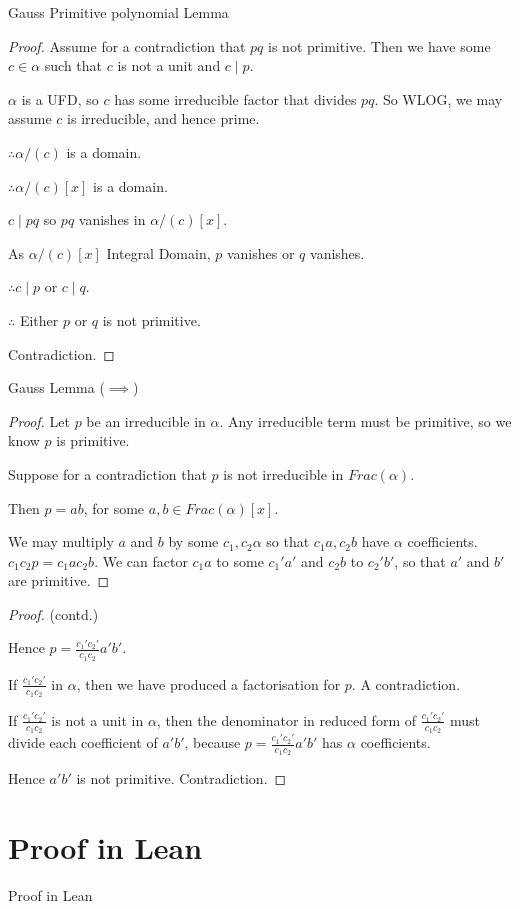 \documentclass{beamer}
\begin{document}
\begin{frame}{Gauss Primitive polynomial Lemma}
  \begin{proof}
    Assume for a contradiction that $pq$ is not primitive. 
    Then we have some $c \in \alpha$ such that $c$ is not a unit and $c \mid p$. 
   
    $\alpha$ is a UFD, so $c$ has some irreducible factor that divides $pq$. So WLOG, we may assume $c$ is irreducible, and hence prime.

    $\therefore \alpha/(c)$ is a domain.
    
    $\therefore \alpha/(c) [x]$ is a domain. 

    $c \mid pq$ so $pq$ vanishes in $\alpha/(c) [x]$. 

    As $\alpha/(c) [x]$ Integral Domain, $p$ vanishes or $q$ vanishes.

   $\therefore c \mid p$ or $c \mid q$. 
    
   $\therefore$ Either $p$ or $q$ is not primitive. 

   Contradiction.
  \end{proof}

\end{frame}

\begin{frame}{Gauss Lemma {($\implies$)}}

  \begin{proof}

    Let $p$ be an irreducible in $\alpha$. Any irreducible term must be primitive, so we know $p$ is primitive. 

    Suppose for a contradiction that $p$ is not irreducible in $Frac (\alpha)$. 

    Then $p = ab$, for some $a,b \in Frac (\alpha)[x]$. 

    We may multiply $a$ and $b$ by some $c_1,c_2 \alpha$ so that $c_1a,c_2b$ have $\alpha$ coefficients. $c_1c_2p = c_1ac_2b$. 
    We can factor $c_1a$ to some $c_1'a'$ and $c_2b$ to $c_2'b'$, so that $a'$ and $b'$ are primitive. 


  \end{proof}
  
\end{frame}

\begin{frame}
  \begin{proof} (contd.)
    
    Hence $p = \frac{c_1'c_2'}{c_1c_2}a'b'$.

    If $\frac{c_1'c_2'}{c_1c_2}$ in $\alpha$, then we have produced a factorisation for $p$. A contradiction. 

    If $\frac{c_1'c_2'}{c_1c_2}$ is not a unit in $\alpha$, then the denominator in reduced form of $\frac{c_1'c_2'}{c_1c_2}$ must divide each coefficient of $a'b'$, because $p =  \frac{c_1'c_2'}{c_1c_2}a'b'$ has $\alpha$ coefficients. 
  
    Hence $a'b'$ is not primitive. Contradiction.

  \end{proof}
  
\end{frame}

\section{Proof in Lean}

\begin{frame}{Proof in Lean}
  
\end{frame}
\end{document}
